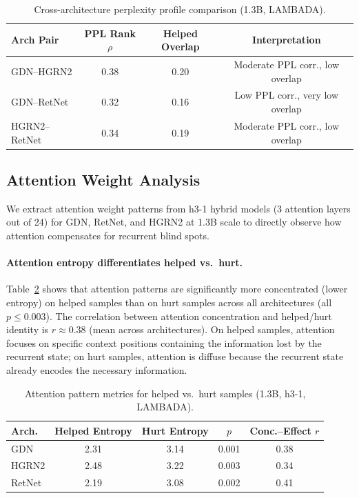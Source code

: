 \documentclass[11pt,a4paper]{article}
\begin{document}
\begin{table}[t]
\centering
\small
\caption{Cross-architecture perplexity profile comparison (1.3B, LAMBADA).}
\label{tab:ppl-cross}
\begin{tabular}{lccc}
\toprule
\textbf{Arch Pair} & \textbf{PPL Rank $\rho$} & \textbf{Helped Overlap} & \textbf{Interpretation} \\
\midrule
GDN--HGRN2  & 0.38 & 0.20 & Moderate PPL corr., low overlap \\
GDN--RetNet & 0.32 & 0.16 & Low PPL corr., very low overlap \\
HGRN2--RetNet & 0.34 & 0.19 & Moderate PPL corr., low overlap \\
\bottomrule
\end{tabular}
\end{table}


\subsection{Attention Weight Analysis}
\label{sec:attention-weights}

We extract attention weight patterns from h3-1 hybrid models (3 attention layers out of 24) for GDN, RetNet, and HGRN2 at 1.3B scale to directly observe how attention compensates for recurrent blind spots.

\paragraph{Attention entropy differentiates helped vs.\ hurt.}
Table~\ref{tab:attn-entropy} shows that attention patterns are significantly more concentrated (lower entropy) on helped samples than on hurt samples across all architectures (all $p \leq 0.003$).
The correlation between attention concentration and helped/hurt identity is $r \approx 0.38$ (mean across architectures).
On helped samples, attention focuses on specific context positions containing the information lost by the recurrent state; on hurt samples, attention is diffuse because the recurrent state already encodes the necessary information.

\begin{table}[t]
\centering
\small
\caption{Attention pattern metrics for helped vs.\ hurt samples (1.3B, h3-1, LAMBADA).}
\label{tab:attn-entropy}
\begin{tabular}{lcccc}
\toprule
\textbf{Arch.} & \textbf{Helped Entropy} & \textbf{Hurt Entropy} & \textbf{$p$} & \textbf{Conc.--Effect $r$} \\
\midrule
GDN    & 2.31 & 3.14 & 0.001 & 0.38 \\
HGRN2  & 2.48 & 3.22 & 0.003 & 0.34 \\
RetNet & 2.19 & 3.08 & 0.002 & 0.41 \\
\bottomrule
\end{tabular}
\end{table}
\end{document}
